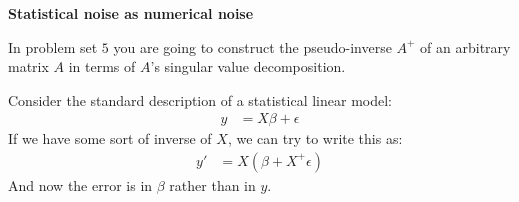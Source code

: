 \begin{frame}[fragile] \frametitle{}

\textbf{Statistical noise as numerical noise}

In problem set $5$ you are going to construct the pseudo-inverse $A^{+}$
of an arbitrary matrix $A$ in terms of $A$'s singular value decomposition.

\pause Consider the standard description of a statistical linear model:
\begin{align*}
y &= X \beta + \epsilon
\end{align*}
If we have some sort of inverse of $X$, we can try to write this as:
\begin{align*}
y' &= X (\beta + X^{+} \epsilon)
\end{align*}
And now the error is in $\beta$ rather than in $y$.

\end{frame}
















